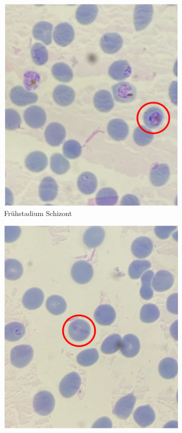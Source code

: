 \documentclass[oneside,10pt,a4paper]{report}
\begin{document}
\begin{figure}[H]
\begin{subfigure}[b]{0.3\textwidth}
						\includegraphics[width=\textwidth]{plas1.png}
						\caption{Frühstadium Schizont}
						\label{fig:2}
					\end{subfigure}
					\hfill
					\begin{subfigure}[b]{0.3\textwidth}
						\includegraphics[width=\textwidth]{plas2.png}

\end{subfigure}
\end{figure}
\end{document}
